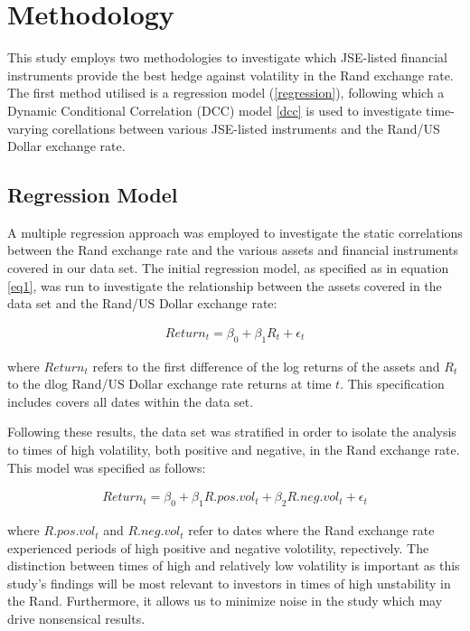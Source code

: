 \documentclass[11pt,preprint, authoryear]{elsarticle}
\numberwithin{equation}{section}
\numberwithin{figure}{section}
\numberwithin{table}{section}
\begin{document}
\section{Methodology}\label{methodology}

This study employs two methodologies to investigate which JSE-listed
financial instruments provide the best hedge against volatility in the
Rand exchange rate. The first method utilised is a regression model
(\ref{regression}), following which a Dynamic Conditional Correlation
(DCC) model \ref{dcc} is used to investigate time-varying corellations
between various JSE-listed instruments and the Rand/US Dollar exchange
rate.

\subsection{\texorpdfstring{Regression Model
\label{regression}}{Regression Model }}\label{regression-model}

A multiple regression approach was employed to investigate the static
correlations between the Rand exchange rate and the various assets and
financial instruments covered in our data set. The initial regression
model, as specified as in equation \ref{eq1}, was run to investigate the
relationship between the assets covered in the data set and the Rand/US
Dollar exchange rate:

\begin{align} 
Return_t = \beta_0 + \beta_1 R_t + \epsilon_t \label{eq1}
\end{align}

where \(Return_t\) refers to the first difference of the log returns of
the assets and \(R_t\) to the dlog Rand/US Dollar exchange rate returns
at time \(t\). This specification includes covers all dates within the
data set.

Following these results, the data set was stratified in order to isolate
the analysis to times of high volatility, both positive and negative, in
the Rand exchange rate. This model was specified as follows:

\begin{align} 
Return_t = \beta_0 + \beta_1 R.pos.vol_t + \beta_2 R.neg.vol_t + \epsilon_t \label{eq2}
\end{align}

where \(R.pos.vol_t\) and \(R.neg.vol_t\) refer to dates where the Rand
exchange rate experienced periods of high positive and negative
volotility, repectively. The distinction between times of high and
relatively low volatility is important as this study's findings will be
most relevant to investors in times of high unstability in the Rand.
Furthermore, it allows us to minimize noise in the study which may drive
nonsensical results.
\end{document}
